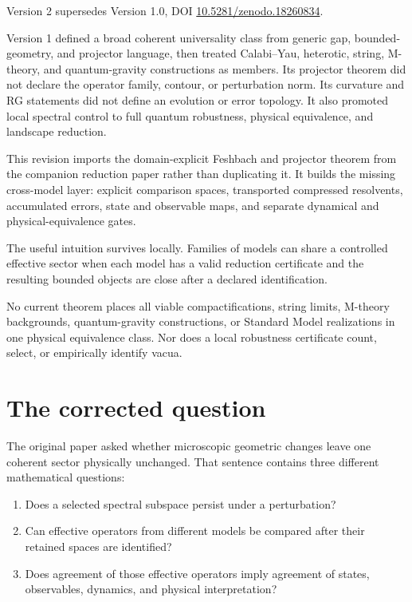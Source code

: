\documentclass[11pt]{article}
\theoremstyle{definition}
\theoremstyle{remark}
\newcommand{\1}{\mathbf 1}
\begin{document}
\begin{description}[leftmargin=2.6cm,style=nextline]
\item[Supersedes]
Version 2 supersedes Version 1.0, DOI
\href{https://doi.org/10.5281/zenodo.18260834}
{10.5281/zenodo.18260834}.

\item[Reason]
Version 1 defined a broad coherent universality class from generic gap,
bounded-geometry, and projector language, then treated Calabi--Yau,
heterotic, string, M-theory, and quantum-gravity constructions as members.
Its projector theorem did not declare the operator family, contour, or
perturbation norm.  Its curvature and RG statements did not define an
evolution or error topology.  It also promoted local spectral control to
full quantum robustness, physical equivalence, and landscape reduction.

\item[Resolution]
This revision imports the domain-explicit Feshbach and projector theorem
from the companion reduction paper rather than duplicating it.  It builds
the missing cross-model layer: explicit comparison spaces, transported
compressed resolvents, accumulated errors, state and observable maps, and
separate dynamical and physical-equivalence gates.

\item[Retained content]
The useful intuition survives locally.  Families of models can share a
controlled effective sector when each model has a valid reduction
certificate and the resulting bounded objects are close after a declared
identification.

\item[Remaining boundary]
No current theorem places all viable compactifications, string limits,
M-theory backgrounds, quantum-gravity constructions, or Standard Model
realizations in one physical equivalence class.  Nor does a local
robustness certificate count, select, or empirically identify vacua.
\end{description}

\tableofcontents

\section{The corrected question}
\label{sec:question}

The original paper asked whether microscopic geometric changes leave one
coherent sector physically unchanged.  That sentence contains three
different mathematical questions:
\begin{enumerate}[leftmargin=2em]
\item Does a selected spectral subspace persist under a perturbation?
\item Can effective operators from different models be compared after
      their retained spaces are identified?
\item Does agreement of those effective operators imply agreement of
      states, observables, dynamics, and physical interpretation?
\end{enumerate}
\end{document}

